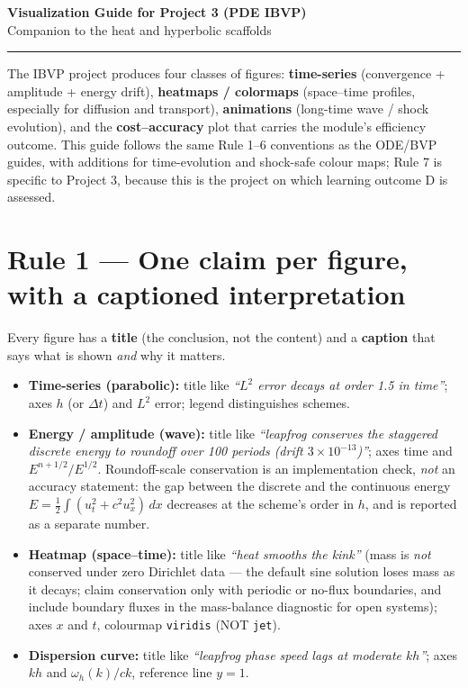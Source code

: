 \documentclass[11pt]{article}
\begin{document}
\begin{center}
  {\LARGE\bfseries Visualization Guide for Project 3 (PDE IBVP)}\\[0.4em]
  {\large Companion to the heat and hyperbolic scaffolds}
\end{center}
\vspace{0.2em}
\hrule
\vspace{0.6em}

The IBVP project produces four classes of figures: \textbf{time-series}
(convergence + amplitude + energy drift), \textbf{heatmaps / colormaps}
(space--time profiles, especially for diffusion and transport),
\textbf{animations} (long-time wave / shock evolution), and the
\textbf{cost--accuracy} plot that carries the module's efficiency outcome.
This guide
follows the same Rule 1--6 conventions as the ODE/BVP guides, with
additions for time-evolution and shock-safe colour maps; Rule 7 is
specific to Project 3, because this is the project on which learning
outcome D is assessed.

\section*{Rule 1 --- One claim per figure, with a captioned interpretation}

Every figure has a \textbf{title} (the conclusion, not the content) and
a \textbf{caption} that says what is shown \emph{and} why it matters.

\begin{itemize}[leftmargin=2em, itemsep=1pt]
  \item\textbf{Time-series (parabolic):}
        title like \emph{``$L^2$ error decays at order 1.5 in time''};
        axes $h$ (or $\Delta t$) and $L^2$ error; legend distinguishes schemes.
  \item\textbf{Energy / amplitude (wave):}
        title like \emph{``leapfrog conserves the staggered discrete energy
        to roundoff over 100 periods (drift $3\times10^{-13}$)''};
        axes time and $E^{n+1/2}/E^{1/2}$. Roundoff-scale conservation is
        an implementation check, \emph{not} an accuracy statement: the gap
        between the discrete and the continuous energy
        $E=\tfrac12\int(u_t^2+c^2u_x^2)\,dx$ decreases at the scheme's
        order in $h$, and is reported as a separate number.
  \item\textbf{Heatmap (space--time):}
        title like \emph{``heat smooths the kink''} (mass is \emph{not}
        conserved under zero Dirichlet data --- the default sine solution
        loses mass as it decays; claim conservation only with periodic or
        no-flux boundaries, and include boundary fluxes in the mass-balance
        diagnostic for open systems);
        axes $x$ and $t$, colourmap \texttt{viridis} (NOT \texttt{jet}).
  \item\textbf{Dispersion curve:}
        title like \emph{``leapfrog phase speed lags at moderate $kh$''};
        axes $kh$ and $\omega_h(k)/ck$, reference line $y=1$.
\end{itemize}
\end{document}
